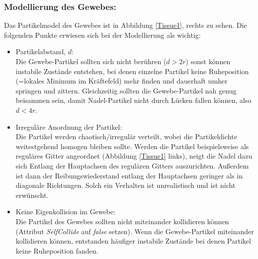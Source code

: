 


\subsubsection{Modellierung des Gewebes:}
Das Partikelmodel des Gewebes ist in Abbildung \ref{Tissue1}, rechts zu sehen. Die folgenden Punkte erwiesen sich bei der Modellierung als wichtig:

    \begin{itemize}
    
      \item Partikelabstand, $d$: \\ Die Gewebe-Partikel sollten sich nicht berühren ($d>2r$) sonst können instabile Zustände entstehen, bei denen einzelne Partikel keine Ruheposition (=lokales Minimum im Kräftefeld) mehr finden und dauerhaft umher springen und zittern. Gleichzeitig sollten die Gewebe-Partikel nah genug beisammen sein, damit Nadel-Partikel nicht durch Lücken fallen können, also $d<4r$. 
      
      \item Irreguläre Anordnung der Partikel: \\ Die Partikel werden chaotisch/irregulär verteilt, wobei die Partikeldichte weitestgehend homogen bleiben sollte. Werden die Partikel beispielsweise als reguläres Gitter angeordnet (Abbildung \ref{Tissue1} links), neigt die Nadel dazu sich Entlang der Hauptachsen des regulären Gitters auszurichten. Außerdem ist dann der Reibungswiederstand entlang der Hauptachsen geringer als in diagonale Richtungen. Solch ein Verhalten ist unrealistisch und ist nicht erwünscht.
      
      
      \item Keine Eigenkollision im Gewebe: \\ Die Partikel des Gewebes sollten nicht miteinander kollidieren können (Attribut \textit{SelfCollide} auf \textit{false} setzen). Wenn die Gewebe-Partikel miteinander kollidieren können, entstanden häufiger instabile Zustände bei denen Partikel keine Ruheposition fanden.
      
    \end{itemize}
    
